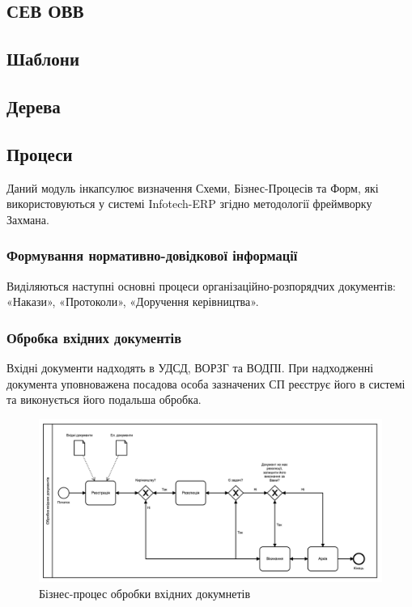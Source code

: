 \subsection{СЕВ ОВВ}

\subsection{Шаблони}

\subsection{Дерева}

\newpage
\subsection{Процеси}

Даний модуль інкапсулює визначення Схеми, Бізнес-Процесів та Форм,
які використовуються у системі Infotech-ERP згідно методології фреймворку Захмана.

\subsubsection{Формування нормативно-довідкової інформації}

Виділяються наступні основні процеси організаційно-розпорядчих
документів: «Накази», «Протоколи», «Доручення керівництва».

\subsubsection{Обробка вхідних документів}

Вхідні документи надходять в УДСД, ВОРЗГ та ВОДПІ.
При надходженні документа уповноважена посадова особа зазначених
СП реєструє його в системі та виконується його подальша обробка.

\begin{figure}[!htbp]
\centerline{\includegraphics[scale=0.25]{handleInputDoc.png}}
\caption{Бізнес-процес обробки вхідних докумнетів}
\end{figure}

